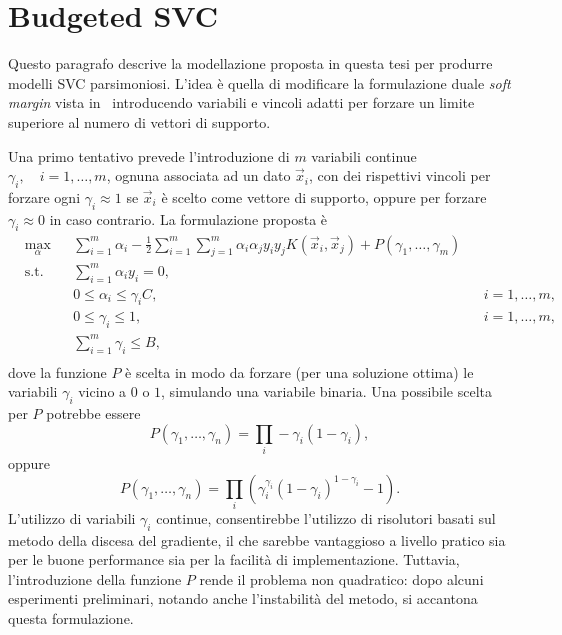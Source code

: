 \section{Budgeted SVC}\label{sec:our_budgeted_svm}
Questo paragrafo descrive la modellazione proposta in questa tesi per produrre modelli SVC parsimoniosi.
L'idea è quella di modificare la formulazione duale \emph{soft margin} vista in~ introducendo variabili e vincoli adatti per forzare un limite superiore al numero di vettori di supporto.

Una primo tentativo prevede l'introduzione di $m$ variabili continue $\gamma_i,\quad i=1,\dots,m$, ognuna associata ad un dato $\Vec{x}_i$, con dei rispettivi vincoli per forzare ogni $\gamma_i\approx1$ se $\Vec{x}_i$ è scelto come vettore di supporto, oppure per forzare $\gamma_i\approx0$ in caso contrario.
La formulazione proposta è 
\begin{equation}\label{eq:budget_svc:continuous_gamma_formulation}
\begin{aligned}
& \max_{\alpha}    && \sum_{i=1}^{m}\alpha_i - \frac{1}{2}\sum_{i=1}^{m}\sum_{j=1}^{m}\alpha_i\alpha_jy_iy_jK(\Vec{x}_i, \Vec{x}_j) +P(\gamma_1, \dots, \gamma_m)\\
& \textrm{s.t.} && \sum_{i=1}^{m} \alpha_iy_i = 0,                   \\
&               && 0 \leq \alpha_i \leq \gamma_iC,   && i=1,\dots,m,  \\
&               && 0 \leq \gamma_i \leq 1,           && i=1, \dots,m,\\
&               && \sum_{i=1}^{m} \gamma_i \leq B,                   \\
\end{aligned}
\end{equation}
dove la funzione $P$ è scelta in modo da forzare (per una soluzione ottima) le variabili $\gamma_i$ vicino a $0$ o $1$, simulando una variabile binaria.
Una possibile scelta per $P$ potrebbe essere 
$$P(\gamma_1, \dots, \gamma_n) = \prod_i -\gamma_i (1 - \gamma_i),$$
oppure 
$$P(\gamma_1, \dots, \gamma_n) = \prod_i \left( \gamma_i^{\gamma_i} (1 - \gamma_i)^{1 - \gamma_i} - 1 \right).$$
%
%
L'utilizzo di variabili $\gamma_i$ continue, consentirebbe l'utilizzo di risolutori basati sul metodo della discesa del gradiente, il che sarebbe vantaggioso a livello pratico sia per le buone performance sia per la facilità di implementazione. 
Tuttavia, l'introduzione della funzione $P$ rende il problema non quadratico: dopo alcuni esperimenti preliminari, notando anche l'instabilità del metodo, si accantona questa formulazione.

